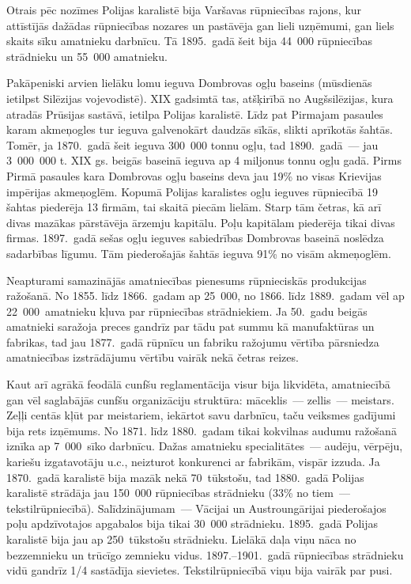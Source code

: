 \documentclass[twoside,a5paper,12pt,fleqn,openany]{extbook}
\begin{document}
Otrais pēc nozīmes Polijas karalistē bija Varšavas rūpniecības rajons, kur attīstījās dažādas rūpniecības nozares un pastāvēja gan lieli uzņēmumi, gan liels skaits sīku amatnieku darbnīcu. Tā 1895.~gadā šeit bija 44~000 rūpniecības strādnieku un 55~000 amatnieku.

Pakāpeniski arvien lielāku lomu ieguva Dombrovas ogļu baseins (mūsdienās ietilpst Silēzijas vojevodistē). XIX gadsimtā tas, atšķirībā no Augšsilēzijas, kura atradās Prūsijas sastāvā, ietilpa Polijas karalistē. Līdz pat Pirmajam pasaules karam akmeņogles tur ieguva galvenokārt daudzās sīkās, slikti aprīkotās šahtās. Tomēr, ja 1870.~gadā šeit ieguva 300~000 tonnu ogļu, tad 1890.~gadā~--- jau 3~000~000 t. XIX gs. beigās baseinā ieguva ap 4 miljonus tonnu ogļu gadā. Pirms Pirmā pasaules kara Dombrovas ogļu baseins deva jau 19\% no visas Krievijas impērijas akmeņoglēm. Kopumā Polijas karalistes ogļu ieguves rūpniecībā 19 šahtas piederēja 13 firmām, tai skaitā piecām lielām. Starp tām četras, kā arī divas mazākas pārstāvēja ārzemju kapitālu. Poļu kapitālam piederēja tikai divas firmas. 1897.~gadā sešas ogļu ieguves sabiedrības Dombrovas baseinā noslēdza sadarbības līgumu. Tām piederošajās šahtās ieguva 91\% no visām akmeņoglēm.

Neapturami samazinājās amatniecības pienesums rūpnieciskās produkcijas ražošanā. No 1855. līdz 1866.~gadam ap 25~000, no 1866. līdz 1889.~gadam vēl ap 22~000~amatnieku kļuva par rūpniecības strādniekiem. Ja 50.~gadu beigās amatnieki saražoja preces gandrīz par tādu pat summu kā manufaktūras un fabrikas, tad jau 1877.~gadā rūpnīcu un fabriku ražojumu vērtība pārsniedza amatniecības izstrādājumu vērtību vairāk nekā četras reizes.

Kaut arī agrākā feodālā cunfšu reglamentācija visur bija likvidēta, amatniecībā gan vēl saglabājās cunfšu organizāciju struktūra: māceklis~--- zellis~--- meistars. Zeļļi centās kļūt par meistariem, iekārtot savu darbnīcu, taču veiksmes gadījumi bija rets izņēmums. No 1871. līdz 1880.~gadam tikai kokvilnas audumu ražošanā iznīka ap 7~000~sīko darbnīcu. Dažas amatnieku specialitātes~--- audēju, vērpēju, kariešu izgatavotāju u.c., neizturot konkurenci ar fabrikām, vispār izzuda. Ja 1870.~gadā karalistē bija mazāk nekā 70~tūkstošu, tad 1880.~gadā Polijas karalistē strādāja jau 150~000 rūpniecības strādnieku (33\% no tiem~--- tekstilrūpniecībā). Salīdzinājumam~--- Vācijai un Austroungārijai piederošajos poļu apdzīvotajos apgabalos bija tikai 30~000 strādnieku. 1895.~gadā Polijas karalistē bija jau ap 250~tūkstošu strādnieku. Lielākā daļa viņu nāca no bezzemnieku un trūcīgo zemnieku vidus. 1897.--1901.~gadā rūpniecības strādnieku vidū gandrīz 1/4 sastādīja sievietes. Tekstilrūpniecībā viņu bija vairāk par pusi.
\end{document}
